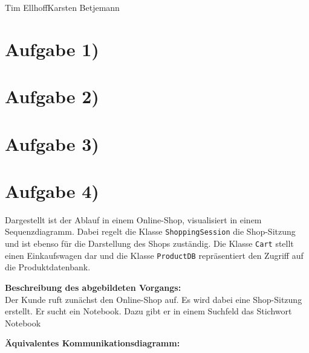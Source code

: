 \documentclass{swp1}
\begin{document}
          {Tim Ellhoff}{Karsten Betjemann}{}
          
\section*{Aufgabe 1)}
\section*{Aufgabe 2)}
\section*{Aufgabe 3)}
\section*{Aufgabe 4)}
Dargestellt ist der Ablauf in einem Online-Shop, visualisiert in einem Sequenzdiagramm. Dabei regelt die Klasse \texttt{ShoppingSession} die Shop-Sitzung und ist ebenso für die Darstellung des Shops zuständig. Die Klasse \texttt{Cart} stellt einen Einkaufswagen dar und die Klasse \texttt{ProductDB} repräsentiert den Zugriff auf die Produktdatenbank.

\textbf{Beschreibung des abgebildeten Vorgangs:}\\
Der Kunde ruft zunächst den Online-Shop auf. Es wird dabei eine Shop-Sitzung erstellt. Er sucht ein Notebook. Dazu gibt er in einem Suchfeld das Stichwort \glqq Notebook\grqq

\textbf{Äquivalentes Kommunikationsdiagramm:}\\
\end{document}

